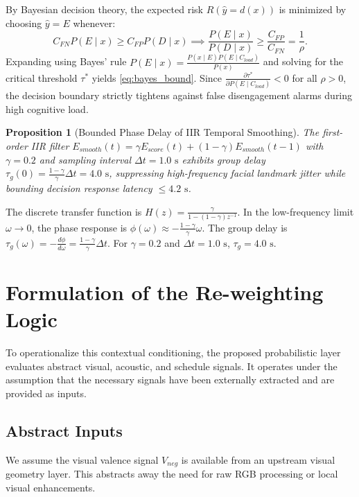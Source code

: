 \documentclass[conference]{IEEEtran}
\newtheorem{proposition}{Proposition}
\begin{document}
\begin{IEEEproof}
By Bayesian decision theory, the expected risk $R(\hat{y}=d(x))$ is minimized by choosing $\hat{y}=E$ whenever:
\begin{equation}
C_{FN} P(E \mid x) \ge C_{FP} P(D \mid x) \implies \frac{P(E \mid x)}{P(D \mid x)} \ge \frac{C_{FP}}{C_{FN}} = \frac{1}{\rho}.
\end{equation}
Expanding using Bayes' rule $P(E \mid x) = \frac{P(x \mid E) P(E \mid C_{load})}{P(x)}$ and solving for the critical threshold $\tau^*$ yields \eqref{eq:bayes_bound}. Since $\frac{\partial \tau^*}{\partial P(E \mid C_{load})} < 0$ for all $\rho > 0$, the decision boundary strictly tightens against false disengagement alarms during high cognitive load.
\end{IEEEproof}

\begin{proposition}[Bounded Phase Delay of IIR Temporal Smoothing]
The first-order IIR filter $E_{smooth}(t) = \gamma E_{score}(t) + (1-\gamma) E_{smooth}(t-1)$ with $\gamma = 0.2$ and sampling interval $\Delta t = 1.0\text{ s}$ exhibits group delay $\tau_g(0) = \frac{1-\gamma}{\gamma} \Delta t = 4.0\text{ s}$, suppressing high-frequency facial landmark jitter while bounding decision response latency $\le 4.2\text{ s}$.
\end{proposition}

\begin{IEEEproof}
The discrete transfer function is $H(z) = \frac{\gamma}{1 - (1-\gamma)z^{-1}}$. In the low-frequency limit $\omega \to 0$, the phase response is $\phi(\omega) \approx -\frac{1-\gamma}{\gamma} \omega$. The group delay is $\tau_g(\omega) = -\frac{d\phi}{d\omega} = \frac{1-\gamma}{\gamma} \Delta t$. For $\gamma = 0.2$ and $\Delta t = 1.0\text{ s}$, $\tau_g = 4.0\text{ s}$.
\end{IEEEproof}

\section{Formulation of the Re-weighting Logic}
To operationalize this contextual conditioning, the proposed probabilistic layer evaluates abstract visual, acoustic, and schedule signals. It operates under the assumption that the necessary signals have been externally extracted and are provided as inputs.

\subsection{Abstract Inputs}
We assume the visual valence signal $V_{neg}$ is available from an upstream visual geometry layer. This abstracts away the need for raw RGB processing or local visual enhancements. 
\end{document}
